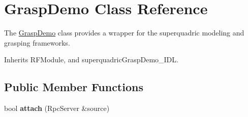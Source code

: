\section{Grasp\+Demo Class Reference}
\label{classGraspDemo}


The \hyperlink{classGraspDemo}{Grasp\+Demo} class provides a wrapper for the superquadric modeling and grasping frameworks.  




Inherits R\+F\+Module, and superquadric\+Grasp\+Demo\+\_\+\+I\+DL.

\subsection*{Public Member Functions}
\begin{DoxyCompactItemize}
\item 
bool {\bfseries attach} (Rpc\+Server \&source)\label{classGraspDemo_a87bd98e4c5db533e4b49291ff0bfea2f}


\end{DoxyCompactItemize}

